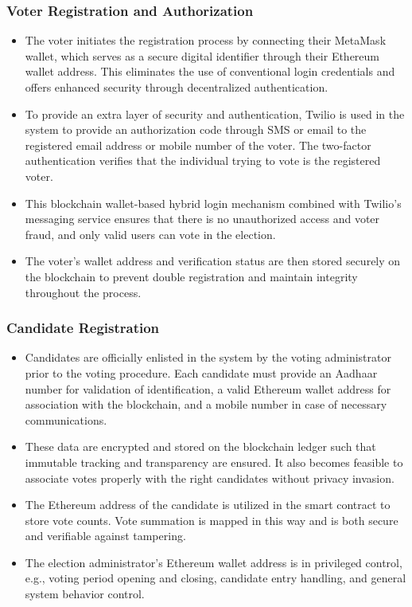 \documentclass[conference]{IEEEtran}
\begin{document}
\subsubsection{Voter Registration and Authorization}
\begin{itemize}
\item The voter initiates the registration process by connecting their MetaMask wallet, which serves as a secure digital identifier through their Ethereum wallet address. This eliminates the use of conventional login credentials and offers enhanced security through decentralized authentication.
\item To provide an extra layer of security and authentication, Twilio is used in the system to provide an authorization code through SMS or email to the registered email address or mobile number of the voter. The two-factor authentication verifies that the individual trying to vote is the registered voter.
\item This blockchain wallet-based hybrid login mechanism combined with Twilio's messaging service ensures that there is no unauthorized access and voter fraud, and only valid users can vote in the election.
\item The voter's wallet address and verification status are then stored securely on the blockchain to prevent double registration and maintain integrity throughout the process.
\end{itemize}

\subsubsection{Candidate Registration}
\begin{itemize}
   \item Candidates are officially enlisted in the system by the voting administrator prior to the voting procedure. Each candidate must provide an Aadhaar number for validation of identification, a valid Ethereum wallet address for association with the blockchain, and a mobile number in case of necessary communications.
\item These data are encrypted and stored on the blockchain ledger such that immutable tracking and transparency are ensured. It also becomes feasible to associate votes properly with the right candidates without privacy invasion.
\item The Ethereum address of the candidate is utilized in the smart contract to store vote counts. Vote summation is mapped in this way and is both secure and verifiable against tampering.
\item The election administrator's Ethereum wallet address is in privileged control, e.g., voting period opening and closing, candidate entry handling, and general system behavior control.
\end{itemize}
\end{document}
